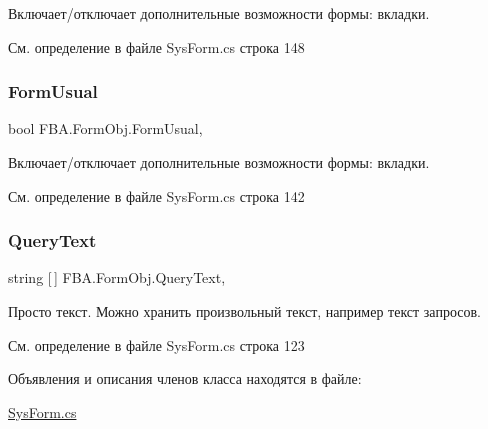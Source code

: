 Включает/отключает дополнительные возможности формы\+: вкладки. 



См. определение в файле Sys\+Form.\+cs строка 148

\mbox{\label{class_f_b_a_1_1_form_obj_af413b06fa4ced1f86f62d660b78071fb}} 
\subsubsection{\texorpdfstring{Form\+Usual}{FormUsual}}
{\footnotesize\ttfamily bool F\+B\+A.\+Form\+Obj.\+Form\+Usual\hspace{0.3cm}{\ttfamily [get]}, {\ttfamily [set]}}



Включает/отключает дополнительные возможности формы\+: вкладки. 



См. определение в файле Sys\+Form.\+cs строка 142

\mbox{\label{class_f_b_a_1_1_form_obj_a84c3e545a6cc2d3c5332635d218f20b8}} 
\subsubsection{\texorpdfstring{Query\+Text}{QueryText}}
{\footnotesize\ttfamily string \mbox{[}$\,$\mbox{]} F\+B\+A.\+Form\+Obj.\+Query\+Text\hspace{0.3cm}{\ttfamily [get]}, {\ttfamily [set]}}



Просто текст. Можно хранить произвольный текст, например текст запросов. 



См. определение в файле Sys\+Form.\+cs строка 123



Объявления и описания членов класса находятся в файле\+:\begin{DoxyCompactItemize}
\item 
\mbox{\hyperlink{_sys_form_8cs}{Sys\+Form.\+cs}}\end{DoxyCompactItemize}
